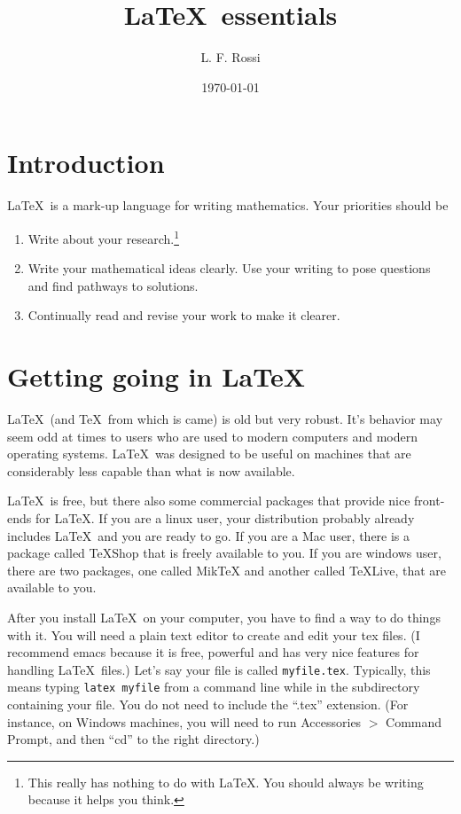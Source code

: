 \documentclass[12pt]{article}
\title{\LaTeX \ essentials}
\author{L. F. Rossi}
\date{\today}
\begin{document}
\maketitle

\section{Introduction}
\label{sec.intro}

\LaTeX \ is a mark-up language for writing mathematics.  Your
priorities should be
\begin{enumerate}

\item Write about your research.\footnote{This really has nothing to
    do with \LaTeX.  You should always be writing because it helps you
    think.}

\item Write your mathematical ideas clearly.  Use your writing to pose
  questions and find pathways to solutions.

\item Continually read and revise your work to make it clearer.

\end{enumerate}

\section{Getting going in \LaTeX}

\LaTeX \ (and \TeX \ from which is came) is
old but very robust.  It's behavior may seem odd at times to users who
are used to modern computers and modern operating systems.  \LaTeX \ was
designed to be useful on machines that are
considerably less capable than what is now available.

\LaTeX \ is free, but there also some commercial packages that provide
nice front-ends for LaTeX.  If you are a linux user, your distribution
probably already includes \LaTeX \ and you are ready to go.  If you are
a Mac user, there is a package called TeXShop that is freely available
to you.  If you are windows user, there are two packages, one called
MikTeX and another called TeXLive, that are available to you.

After you install \LaTeX \ on your computer, you have to find a way to
do things with it.  You will need a plain text editor to create and
edit your tex files.  (I recommend emacs because it is free, powerful
and has very nice features for handling \LaTeX \ files.)  Let's say
your file is called {\tt myfile.tex}.  Typically, this means typing
{\tt latex myfile} from a command line while in the subdirectory
containing your file.  You do not need to include the ``.tex''
extension.  (For instance, on Windows machines, you will need to run
Accessories $>$ Command Prompt, and then ``cd'' to the right
directory.)
\end{document}
